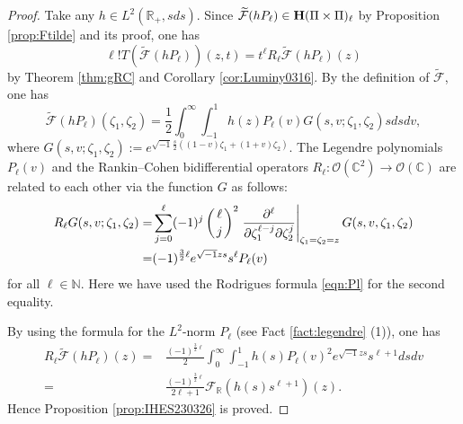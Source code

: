 \documentclass[12pt,leqno]{amsart}
\theoremstyle{plain}
\theoremstyle{definition}
\begin{document}
\begin{proof}
Take any $h \in L^2({\mathbb{R}}_+, s d s)$.  
Since $\widetilde{\mathcal{F}}(h P_{\ell})
 \in {\bf{H}}(\Pi \times \Pi)_{\ell}$
 by Proposition \ref{prop:Ftilde} and its proof, 
 one has
\[
   \ell ! T(\widetilde{\mathcal{F}}(h P_{\ell}))(z,t)
=
t^{\ell} R_{\ell}
\widetilde{\mathcal{F}}(h P_{\ell})(z)
\]
by Theorem \ref{thm:gRC} and 
Corollary \ref{cor:Luminy0316}.  
By the definition of $\widetilde{\mathcal{F}}$, 
 one has
\[
  \widetilde{\mathcal{F}}(h P_{\ell})(\zeta_1, \zeta_2)
=
  \frac 1 2 
  \int_{0}^{\infty} \int_{-1}^1
  h(z) P_{\ell}(v)
  G(s, v; \zeta_1, \zeta_2)
  s d s d v, 
\]
 where
$
   G(s, v;\zeta_1, \zeta_2):=
 e^{\sqrt{-1} \frac s 2 ((1-v)\zeta_1+(1+v)\zeta_2)}.  
$
The Legendre polynomials $P_{\ell}(v)$
 and the Rankin--Cohen bidifferential operators 
$
   R_{\ell} \colon {\mathcal{O}}({\mathbb{C}}^2) \to {\mathcal{O}}({\mathbb{C}})$
 are related to each other via the function $G$ as follows:
\begin{align*}
R_{\ell}G(s, v;\zeta_1, \zeta_2)
=&
\sum_{j=0}^{\ell}
(-1)^j \left(\ell  \atop j \right)^2
\left. \frac{\partial^{\ell}}{\partial\zeta_1^{\ell-j} \partial \zeta_2^j}\right|_{\zeta_1=\zeta_2=z}
G(s, v, \zeta_1, \zeta_2)
\\
=& (-1)^{\frac 3 2 \ell} e^{\sqrt{-1}zs} s^{\ell} P_{\ell}(v)
\end{align*}
for all $\ell \in {\mathbb{N}}$.  
Here we have used 
 the Rodrigues formula \eqref{eqn:Pl}
 for  the second equality.  



By using the formula for the $L^2$-norm $P_{\ell}$
 (see Fact \ref{fact:legendre} (1)), 
 one has
\begin{align*}
R_{\ell}\widetilde{\mathcal{F}}(h P_{\ell})(z)
=&\frac{(-1)^{\frac 3 2 \ell}}2 \int_0^{\infty}\int_{-1}^1
 h(s) P_{\ell}(v)^2 e^{\sqrt{-1}z s} s^{\ell+1} d s d v
\\
=&\frac{(-1)^{\frac 3 2 \ell}}{2\ell+1}{\mathcal{F}}_{\mathbb{R}}(h(s)s^{\ell+1})(z).  
\end{align*}
Hence Proposition \ref{prop:IHES230326} is proved.  
\end{proof}
\end{document}
